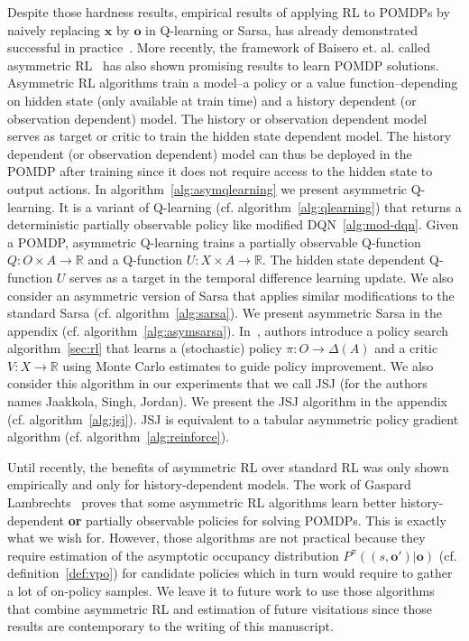 Despite those hardness results, empirical results of applying RL to POMDPs by naively replacing $\boldsymbol{x}$ by $\boldsymbol{o}$ in Q-learning or Sarsa, has already demonstrated successful in practice~\cite{sarsa-pomdp}. 
More recently, the framework of Baisero et. al. called asymmetric RL~\cite{baisero-dqn,baisero-ppo} has also shown promising results to learn POMDP solutions.
Asymmetric RL algorithms train a model--a policy or a value function--depending on hidden state (only available at train time) and a history dependent (or observation dependent) model.
The history or observation dependent model serves as target or critic to train the hidden state dependent model.
The history dependent (or observation dependent) model can thus be deployed in the POMDP after training since it does not require access to the hidden state to output actions.
In algorithm~\ref{alg:asymqlearning} we present asymmetric Q-learning. It is a variant of Q-learning (cf. algorithm~\ref{alg:qlearning}) that returns a deterministic partially observable policy like modified DQN~\ref{alg:mod-dqn}.
Given a POMDP, asymmetric Q-learning trains a partially observable Q-function $Q:O\times A\rightarrow\mathbb{R}$ and a Q-function $U:X\times A\rightarrow\mathbb{R}$. The hidden state dependent Q-function $U$ serves as a target in the temporal difference learning update. 
We also consider an asymmetric version of Sarsa that applies similar modifications to the standard Sarsa (cf. algorithm~\ref{alg:sarsa}). We present asymmetric Sarsa in the appendix (cf. algorithm~\ref{alg:asymsarsa}).
In~\cite{jsj}, authors introduce a policy search algorithm~\ref{sec:rl} that learns a (stochastic) policy $\pi:O\rightarrow\Delta(A)$ and a critic $V:X\rightarrow \mathbb{R}$ using Monte Carlo estimates to guide policy improvement.
We also consider this algorithm in our experiments that we call JSJ (for the authors names Jaakkola, Singh, Jordan). We present the JSJ algorithm in the appendix (cf. algorithm~\ref{alg:jsj}).
JSJ is equivalent to a tabular asymmetric policy gradient algorithm (cf. algorithm~\ref{alg:reinforce}). 

Until recently, the benefits of asymmetric RL over standard RL was only shown empirically and only for history-dependent models.
The work of Gaspard Lambrechts~\cite{justif-asym} proves that some asymmetric RL algorithms learn better history-dependent \textbf{or} partially observable policies for solving POMDPs.
This is exactly what we wish for. However, those algorithms are not practical because they require estimation of the asymptotic occupancy distribution $P^{\pi}((s, \boldsymbol{o}')|\boldsymbol{o})$ (cf. definition~\ref{def:vpo}) for candidate policies which in turn would require to gather a lot of on-policy samples.
We leave it to future work to use those algorithms that combine asymmetric RL and estimation of future visitations since those results are contemporary to the writing of this manuscript.

